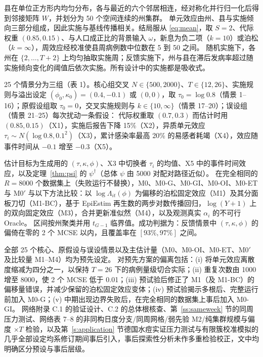\documentclass[11pt,a4paper]{ctexart}
\theoremstyle{definition}
\begin{document}
县在单位正方形内均匀分布，各与最近的六个邻居相连，经对称化并行归一化后得到邻接矩阵 $W$，并划分为 50 个空间连续的州集群。
单元效应由州、县与实施倾向三部分组成，因此实施与基线传播相关。结局服从 \eqref{eq:mean}，取 $S=2$、代际权重 $(0.85,0.15)$、与人口成正比的背景输入 $\omega$，新息为负二项（$k=10$）或泊松（$k=\infty$），周效应经校准使县周病例数中位数在 5 到 50 之间。
随机实施下，各州在 $\{2,\dots,T+2\}$ 上均匀抽取实施周；反馈实施下，州与县在滞后发病率超过随实施倾向变化的阈值后依次实施。所有设计中的实施都是吸收式。

25 个情景分为三组（表 1）。核心组交叉 $N\in\{500,2000\}$、$T\in\{12,26\}$、实施规则与溢出设定 $(\phi_0,\kappa_0)=(0.4,-0.1)$ 或 $(0,0)$，取 $\tau_0=\log0.8$（情景 1--16）；原假设组取 $\tau_0=0$，交叉实施规则与 $k\in\{10,\infty\}$（情景 17--20）；误设组（情景 21--25）每次扰动一条假设：
代际权重取 $(0.7,0.3)$ 而估计时用 $(0.85,0.15)$（X1），实施后报告下降 15\%（X2），异质单元效应 $\tau_i\sim N(\log0.8,0.1^2)$（X3），累计感染率最高 20\% 的易感者耗竭（X4），效应随事件时间从 $-0.1$ 增至 $-0.3$（X5）。

估计目标为生成用的 $(\tau,\kappa,\phi)$、X3 中切换者 $\tau_i$ 的均值、X5 中的事件时间效应，以及定理~\ref{thm:psi} 的 $\psi^\dagger$（总体 $\psi$ 由 5000 对配对路径近似）。
在完全相同的 $R=8000$ 个数据集上（失败运行不替换），M0、M0-G、M0-GI、M0-OI、M0-ET 与 M0$'$ 与以下方法比较：以 $\log\Lambda_{it}(\phi)$ 为偏移的泊松固定效应（M1）及其分面板刀切（M1-BC），基于 EpiEstim 再生数的两步对数传播回归\citep[M2;][]{cori2013epiestim}，$\log(Y+1)$ 上的双向固定效应（M3），合并更新准似然（M4），以及观测真实 $\alpha_i$ 的不可行 Oracle。
区间按州聚类并用 $t_{G-1}$ 临界值。成功判据为：反馈情景中 $(\tau,\kappa,\phi)$ 的偏倚在零的 2 个 MCSE 以内，且覆盖率在 $[93\%,97\%]$ 之间。

全部 25 个核心、原假设与误设情景以及主估计量（M0、M0-OI、M0-ET、M0$'$ 及比较量 M1--M4）均为预先设定。
对预先方案的偏离包括：(i) 将单元效应离散度缩减为四分之一，以保持 $T=26$ 下的病例量级切合实际；(ii) 重复次数由 1000 增至 8000，使 2 个 MCSE 低于 0.01；(iii) 预试验后修正了 M1（及 M1-BC）的偏移量错误，并减少保留的泊松固定效应变体；(iv) 预试验揭示多根后、完整运行前加入 M0-G；(v) 中期出现边界失败后，在完全相同的数据集上事后加入 M0-GI。
网络附录 C.1 的验证设计、C.2 的总体根核查、第~\ref{ss:sameweek} 节的同周压力测试、网络表 7--8 的非同构日度分支/同周网格/弱先验 M2/纯集群规模与偏度 $\times T$ 检验，以及第~\ref{s:application} 节德国水痘实证压力测试与有限簇校准模拟的几乎全部设定均系修订期间事后引入，事后探索性分析未作多重检验校正\citep{weill2021flexibility}，文中均明确区分预设与事后层级。
\end{document}

